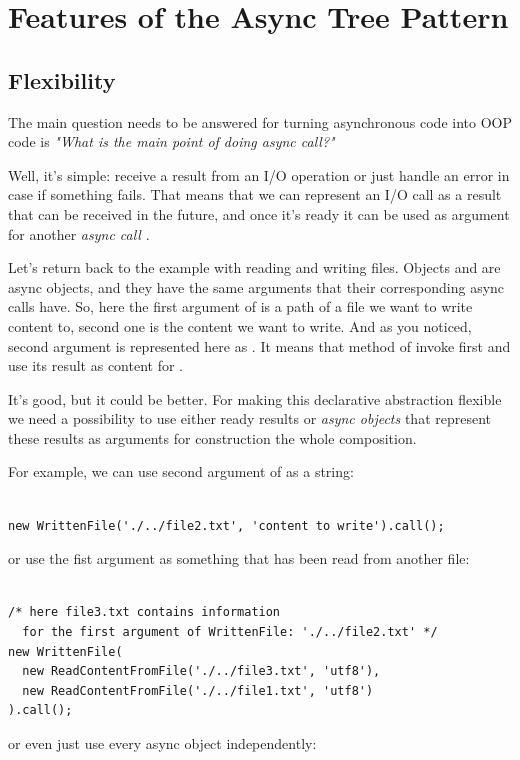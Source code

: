 \documentclass{article}
\newcommand{\cit}[1]{{\fontfamily{qcr}\selectfont{\textit{\textcolor{superdarkgray}{#1}}}}}
\begin{document}
\section{Features of the Async Tree Pattern}

\subsection{Flexibility}

The main question needs to be answered for turning asynchronous code into OOP code is \textit{"What is the main point of doing async call?"}

Well, it's simple: receive a result from an I/O operation or just handle an error in case if something fails. That means that we can represent an I/O call as a result that can be received in the future, and once it's ready it can be used as argument for another \textit{ async call }.

Let's return back to the example with reading and writing files. Objects \cit{WrittenFile} and \cit{ReadContentFromFile} are async objects, and they have the same arguments that their corresponding async calls have. So, here the first argument of \cit{WrittenFile} is a path of a file we want to write content to, second one is the content we want to write. And as you noticed, second argument is represented here as \cit{ReadContentFromFile}. It means that method \cit{call()} of \cit{WrittenFile} invoke first \cit{ReadContentFromFile} and use its result as content for \cit{WrittenFile}.

It's good, but it could be better. For making this declarative abstraction flexible we need a possibility to use either ready results or \textit{async objects} that represent these results as arguments for construction the whole composition.

For example, we can use second argument of \cit{WrittenFile} as a string:

\begin{lstlisting}

new WrittenFile('./../file2.txt', 'content to write').call();

\end{lstlisting}
or use the fist argument as something that has been read from another file:

\begin{lstlisting}

/* here file3.txt contains information 
  for the first argument of WrittenFile: './../file2.txt' */
new WrittenFile(
  new ReadContentFromFile('./../file3.txt', 'utf8'), 
  new ReadContentFromFile('./../file1.txt', 'utf8')
).call();

\end{lstlisting}
or even just use every async object independently:
\end{document}
